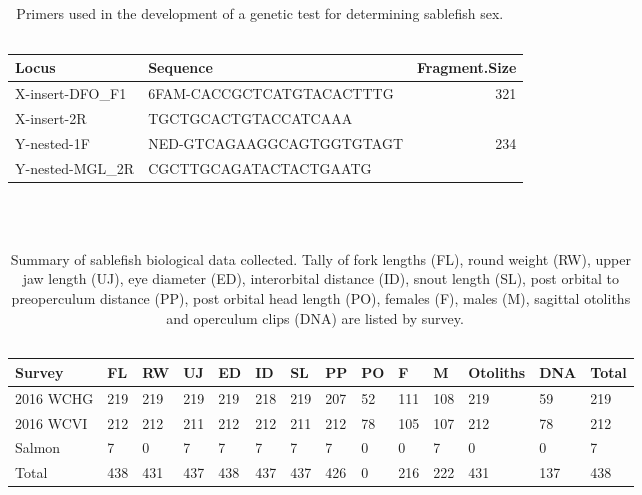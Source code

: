 \documentclass[12pt]{article}\usepackage[]{graphicx}\usepackage[]{color}
\begin{document}
\begin{table}[!h]

\caption{\label{tab:table2}Primers used in the development of a genetic test for determining sablefish sex. ~\\
\hspace*{0.333em}\\}
\fontsize{10}{12}\selectfont
\begin{tabular}[t]{llr}
\toprule
\textbf{Locus} & \textbf{Sequence} & \textbf{Fragment.Size}\\
\midrule
X-insert-DFO\_F1 & 6FAM-CACCGCTCATGTACACTTTG & 321\\
X-insert-2R & TGCTGCACTGTACCATCAAA & \\
Y-nested-1F & NED-GTCAGAAGGCAGTGGTGTAGT & 234\\
Y-nested-MGL\_2R & CGCTTGCAGATACTACTGAATG & \\
\bottomrule
\end{tabular}
\end{table}
~\\
\hspace*{0.333em}\\


\begin{table}[!h]

\caption{\label{tab:table3}Summary of sablefish biological data collected. Tally of fork lengths (FL), round weight (RW), upper jaw length (UJ), eye diameter (ED), interorbital distance (ID), snout length (SL), post orbital to preoperculum distance (PP), post orbital head length (PO), females (F), males (M), sagittal otoliths and operculum clips (DNA) are listed by survey. ~\\
\hspace*{0.333em}\\}
\fontsize{10}{12}\selectfont
\begin{tabular}[t]{llllllllllllll}
\toprule
\textbf{Survey} & \textbf{FL} & \textbf{RW} & \textbf{UJ} & \textbf{ED} & \textbf{ID} & \textbf{SL} & \textbf{PP} & \textbf{PO} & \textbf{F} & \textbf{M} & \textbf{Otoliths} & \textbf{DNA} & \textbf{Total}\\
\midrule
2016 WCHG & 219 & 219 & 219 & 219 & 218 & 219 & 207 & 52 & 111 & 108 & 219 & 59 & 219\\
2016 WCVI & 212 & 212 & 211 & 212 & 212 & 211 & 212 & 78 & 105 & 107 & 212 & 78 & 212\\
Salmon & 7 & 0 & 7 & 7 & 7 & 7 & 7 & 0 & 0 & 7 & 0 & 0 & 7\\
\midrule
Total & 438 & 431 & 437 & 438 & 437 & 437 & 426 & 0 & 216 & 222 & 431 & 137 & 438\\
\bottomrule
\end{tabular}
\end{table}
\end{document}
